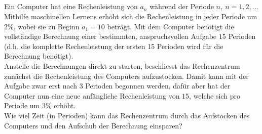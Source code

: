 \subsection*{}
Ein Computer hat eine Rechenleistung von $ a_n $ während der Periode $ n, \ n = 1,2,... $
Mithilfe maschinellen Lernens erhöht sich die Rechenleistung in jeder Periode um $ 2 \%  $, wobei sie zu Beginn $ a_1 = 10 $ beträgt.
Mit dem Computer benötigt die vollständige Berechnung einer bestimmten, anspruchsvollen Aufgabe $ 15 $ Perioden (d.h. die komplette Rechenleistung der ersten 15 Perioden wird für die Berechnung benötigt).\\
Anstelle die Berechnungen direkt zu starten, beschliesst das Rechenzentrum  zunächst die Rechenleistung des Computers aufzustocken.
Damit kann mit der Aufgabe zwar erst nach $ 3 $ Perioden begonnen werden, dafür aber hat der Computer nun eine neue anfängliche Rechenleistung von $ 15 $, welche sich pro Periode um $ 3 \% $ erhöht.\\
Wie viel Zeit (in Perioden) kann das Rechenzentrum durch das Aufstocken des Computers und den Aufschub der Berechnung einsparen?
\\ 
\\
